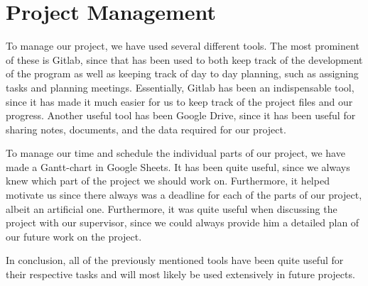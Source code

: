 \section{Project Management}
To manage our project, we have used several different tools. The most prominent of these is Gitlab, since that has been used to both keep track of the development of the program as well as keeping track of day to day planning, such as assigning tasks and planning meetings. Essentially, Gitlab has been an indispensable tool, since it has made it much easier for us to keep track of the project files and our progress.
Another useful tool has been Google Drive, since it has been useful for sharing notes, documents, and the data required for our project.


To manage our time and schedule the individual parts of our project, we have made a Gantt-chart in Google Sheets. It has been quite useful, since we always knew which part of the project we should work on. Furthermore, it helped motivate us since there always was a deadline for each of the parts of our project, albeit an artificial one. Furthermore, it was quite useful when discussing the project with our supervisor, since we could always provide him a detailed plan of our future work on the project.

In conclusion, all of the previously mentioned tools have been quite useful for their respective tasks and will most likely be used extensively in future projects.